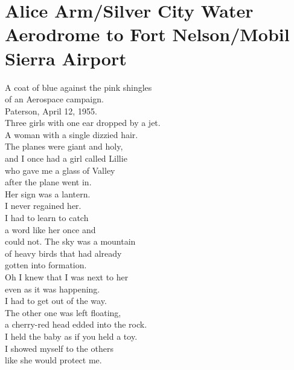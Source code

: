 \documentclass[smalldemyvopaper,11pt,twoside,onecolumn,openright,extrafontsizes]{memoir}
\newlength\drop
\begin{document}
\chapter{Alice Arm/Silver City Water Aerodrome to Fort Nelson/Mobil Sierra Airport}
A coat of blue against the pink shingles
\\of an Aerospace campaign.
\\Paterson, April 12, 1955.
\\Three girls with one ear dropped by a jet.
\\A woman with a single dizzied hair.
\\The planes were giant and holy,
\\and I once had a girl called Lillie
\\who gave me a glass of Valley
\\after the plane went in.
\\Her sign was a lantern.
\\I never regained her.
\\I had to learn to catch
\\a word like her once and
\\could not. The sky was a mountain
\\of heavy birds that had already
\\gotten into formation.
\\Oh I knew that I was next to her
\\even as it was happening.
\\I had to get out of the way.
\\The other one was left floating,
\\a cherry-red head edded into the rock.
\\I held the baby as if you held a toy.
\\I showed myself to the others
\\like she would protect me.
\end{document}
